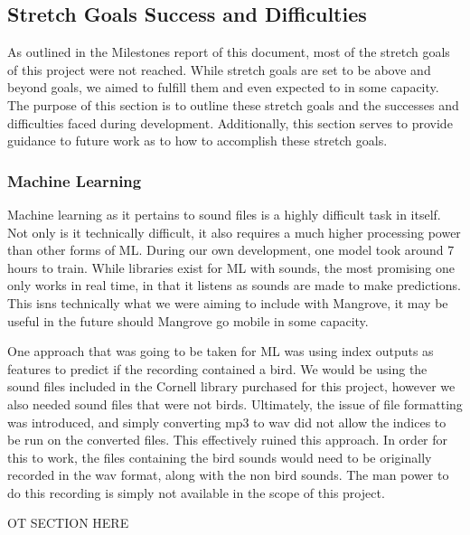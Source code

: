 \subsection{Stretch Goals Success and Difficulties}
As outlined in the Milestones report of this document, most of the stretch goals of this project were not reached. While stretch goals are set to be above and beyond goals, we aimed to fulfill them and even expected to in some capacity. The purpose of this section is to outline these stretch goals and the successes and difficulties faced during development. Additionally, this section serves to provide guidance to future work as to how to accomplish these stretch goals.\\

\subsubsection{Machine Learning}
Machine learning as it pertains to sound files is a highly difficult task in itself. Not only is it technically difficult, it also requires a much higher processing power than other forms of ML. During our own development, one model took around 7 hours to train. While libraries exist for ML with sounds, the most promising one only works in real time, in that it listens as sounds are made to make predictions. This isn\textquotesingle s technically what we were aiming to include with Mangrove, it may be useful in the future should Mangrove go mobile in some capacity.\par
One approach that was going to be taken for ML was using index outputs as features to predict if the recording contained a bird. We would be using the sound files included in the Cornell library purchased for this project, however we also needed sound files that were not birds. Ultimately, the issue of file formatting was introduced, and simply converting mp3 to wav did not allow the indices to be run on the converted files. This effectively ruined this approach. In order for this to work, the files containing the bird sounds would need to be originally recorded in the wav format, along with the non bird sounds. The man power to do this recording is simply not available in the scope of this project.\par
OT SECTION HERE

